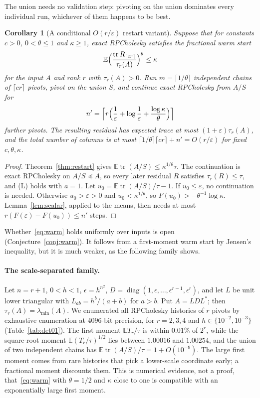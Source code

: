 \documentclass[11pt]{article}
\newtheorem{corollary}[theorem]{Corollary}
\theoremstyle{definition}\newtheorem{definition}[theorem]{Definition}
\theoremstyle{remark}\newtheorem{remark}[theorem]{Remark}
\newcommand{\E}{\mathbb E}
\newcommand{\eps}{\varepsilon}
\newcommand{\tr}{\operatorname{tr}}
\newcommand{\diag}{\operatorname{diag}}
\newcommand{\1}{\mathbf 1}
\begin{document}
The union needs no validation step: pivoting on the union dominates
every individual run, whichever of them happens to be best.

\begin{corollary}[A conditional $O(r/\eps)$ restart variant]\label{cor:restart}
Suppose that for constants $c>0$, $0<\theta\le1$ and $\kappa\ge1$, exact
RPCholesky satisfies the fractional warm start
\begin{equation}\label{eq:warm}
 \E\Bigl(\frac{\tr R_{\lceil cr\rceil}}{\tau_r(A)}\Bigr)^\theta\le\kappa
\end{equation}
for the input $A$ and rank $r$ with $\tau_r(A)>0$. Run
$m=\lceil1/\theta\rceil$ independent chains of $\lceil cr\rceil$ pivots,
pivot on the union $S$, and continue exact RPCholesky from $A/S$ for
\[
 n'=\Bigl\lceil r\Bigl(\frac1\eps+\log\frac1\eps+\frac{\log\kappa}\theta\Bigr)\Bigr\rceil
\]
further pivots. The resulting residual has expected trace at most
$(1+\eps)\tau_r(A)$, and the total number of columns is at most
$\lceil1/\theta\rceil\lceil cr\rceil+n'=O(r/\eps)$ for fixed
$c,\theta,\kappa$.
\end{corollary}
\begin{proof}
Theorem~\ref{thm:restart} gives $\E\tr(A/S)\le\kappa^{1/\theta}\tau$.
The continuation is exact RPCholesky on $A/S\preceq A$, so
every later residual $R$ satisfies $\tau_r(R)\le\tau$, and (L) holds
with $a=1$.
Let $u_0=\E\tr(A/S)/\tau-1$. If $u_0\le\eps$, no continuation is
needed. Otherwise $u_0>\eps>0$ and $u_0<\kappa^{1/\theta}$, so
$F(u_0)>-\theta^{-1}\log\kappa$. Lemma~\ref{lem:scalar}, applied to
the means, then needs at most $r(F(\eps)-F(u_0))\le n'$ steps.
\end{proof}

Whether~\eqref{eq:warm} holds uniformly over inputs is open
(Conjecture~\ref{conj:warm}). It follows from a first-moment warm start
by Jensen's inequality, but it is much weaker, as the following family
shows.

\paragraph{The scale-separated family.}
Let $n=r+1$, $0<h<1$, $\epsilon=h^{n^2}$, $D=\diag(1,\epsilon,\dots,
\epsilon^{r-1},\epsilon^r)$, and let $L$ be unit lower triangular with
$L_{ab}=h^b/(a+b)$ for $a>b$. Put $A=LDL^*$; then
$\tau_r(A)=\lambda_{\min}(A)$. We enumerated all RPCholesky histories of
$r$ pivots by exhaustive enumeration at $4096$-bit precision, for $r=2,3,4$ and
$h\in\{10^{-2},10^{-3}\}$ (Table~\ref{tab:det01}). The first moment
$\E T_r/\tau$ is within $0.01\%$ of $2^r$, while the square-root moment
$\E(T_r/\tau)^{1/2}$ lies between $1.00016$ and $1.00254$, and the union
of two independent chains has $\E\tr(A/S)/\tau=1+O(10^{-9})$. The large
first moment comes from rare histories that pick a lower-scale
coordinate early; a fractional moment discounts them. This is numerical
evidence, not a proof, that~\eqref{eq:warm} with $\theta=1/2$ and
$\kappa$ close to one is compatible with an exponentially large first
moment.
\end{document}
